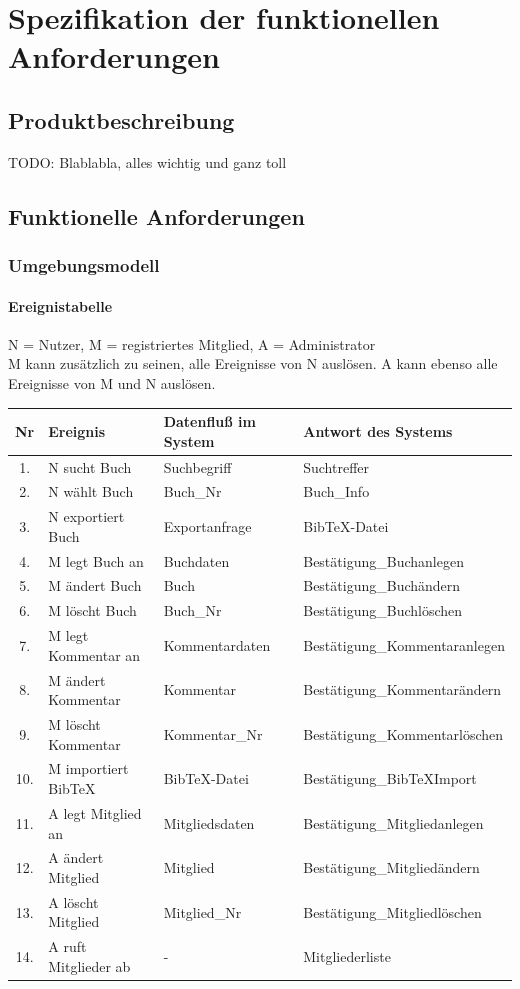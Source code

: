 \chapter{Spezifikation der funktionellen Anforderungen}
\section{Produktbeschreibung}
TODO: Blablabla, alles wichtig und ganz toll

\section{Funktionelle Anforderungen}
\subsection{Umgebungsmodell}

\subsubsection{Ereignistabelle}
N = Nutzer, M = registriertes Mitglied, A = Administrator \\
M kann zusätzlich zu seinen, alle Ereignisse von N auslösen. A kann ebenso alle Ereignisse von M und N auslösen.

\begin{longtable}{|c|p{9.0em}|p{10.5em}|l|}
\hline
Nr & Ereignis & Datenfluß im System & Antwort des Systems \\
\hline\hline
\endhead

1. & N sucht Buch & Suchbegriff & Suchtreffer \\\hline
2. & N wählt Buch & Buch\_Nr & Buch\_Info \\\hline
3. & N exportiert Buch & Exportanfrage &  BibTeX-Datei \\\hline
4. & M legt Buch an & Buchdaten & Bestätigung\_Buchanlegen \\\hline
5. & M ändert Buch & Buch & Bestätigung\_Buchändern\\\hline
6. & M löscht Buch & Buch\_Nr & Bestätigung\_Buchlöschen \\\hline
7. & M legt Kommentar an & Kommentardaten & Bestätigung\_Kommentaranlegen \\\hline
8. & M ändert Kommentar & Kommentar & Bestätigung\_Kommentarändern \\\hline
9. & M löscht Kommentar & Kommentar\_Nr & Bestätigung\_Kommentarlöschen \\\hline
10.& M importiert BibTeX & BibTeX-Datei & Bestätigung\_BibTeXImport \\\hline
11.& A legt Mitglied an & Mitgliedsdaten & Bestätigung\_Mitgliedanlegen \\\hline
12.& A ändert Mitglied & Mitglied & Bestätigung\_Mitgliedändern \\\hline
13.& A löscht Mitglied & Mitglied\_Nr & Bestätigung\_Mitgliedlöschen \\\hline
14.& A ruft Mitglieder ab & - & Mitgliederliste \\\hline
\end{longtable}


